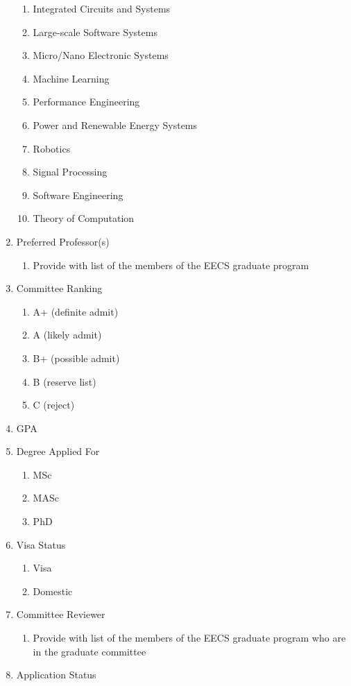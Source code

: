 \documentclass[fontsize=12pt,paper=letter,twoside]{scrartcl}
\begin{document}
\begin{mylist}
\begin{enumerate}
\begin{enumerate}
\item Integrated Circuits and Systems
\item Large-scale Software Systems
\item Micro/Nano Electronic Systems
\item Machine Learning
\item Performance Engineering
\item Power and Renewable Energy Systems
\item Robotics
\item Signal Processing
\item Software Engineering
\item Theory of Computation
\end{enumerate}
\item Preferred Professor(s)
\begin{enumerate}
\item Provide with list of the members of the EECS graduate program
\end{enumerate}
\item Committee Ranking
\begin{enumerate}
\item A+ (definite admit)
\item A (likely admit)
\item B+ (possible admit)
\item B (reserve list)
\item C (reject)
\end{enumerate}
\item GPA
\item Degree Applied For
\begin{enumerate}
\item MSc
\item MASc
\item PhD
\end{enumerate}
\item Visa Status
\begin{enumerate}
\item Visa
\item Domestic
\end{enumerate}
\item Committee Reviewer
\begin{enumerate}
\item Provide with list of the members of the EECS graduate program who are in the graduate committee
\end{enumerate}
\item Application Status
\begin{enumerate}

\end{enumerate}
\end{enumerate}
\end{mylist}
\end{document}
